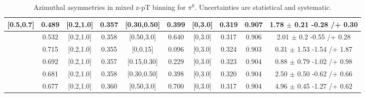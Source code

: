 \begin{table}[H]
\begin{tabular}{|c| c| c| c| c| c| c| c| c| c|}
[0.5,0.7]	&	0.489	&	[0.2,1.0]	&	0.357	&	[0.30,0.50]	&	0.399	&	[0,3.0]	&	0.319	&	0.907	&	1.78	$\pm$ 	0.21	-0.28	/+	0.30	\\ \hline
[0.5,0.7]	&	0.532	&	[0.2,1.0]	&	0.358	&	[0.50,3.0]	&	0.640	&	[0,3.0]	&	0.317	&	0.906	&	2.01	$\pm$ 	0.2	-0.55	/+	0.28	\\ \hline
 \hline
[0.7,1.0]	&	0.715	&	[0.2,1.0]	&	0.355	&	[0,0.15]	&	0.096	&	[0,3.0]	&	0.324	&	0.903	&	0.31	$\pm$ 	1.53	-1.54	/+	1.87	\\ \hline
[0.7,1.0]	&	0.692	&	[0.2,1.0]	&	0.357	&	[0.15,0.30]	&	0.229	&	[0,3.0]	&	0.323	&	0.904	&	0.88	$\pm$ 	0.79	-1.02	/+	0.98	\\ \hline
[0.7,1.0]	&	0.681	&	[0.2,1.0]	&	0.358	&	[0.30,0.50]	&	0.398	&	[0,3.0]	&	0.320	&	0.904	&	2.50	$\pm$ 	0.50	-0.62	/+	0.66	\\ \hline
[0.7,1.0]	&	0.677	&	[0.2,1.0]	&	0.360	&	[0.50,3.0]	&	0.700	&	[0,3.0]	&	0.317	&	0.904	&	4.96	$\pm$ 	0.45	-1.27	/+	0.62	\\ \hline
\end{tabular}
\caption{Azimuthal asymmetries in mixed z-pT binning for $\pi^0$. Uncertainties are statistical and systematic.}
\label{tab:finalpi0ptbins}
\end{table}

